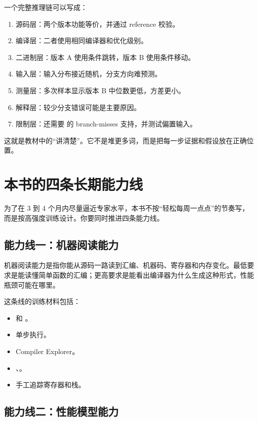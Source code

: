 一个完整推理链可以写成：

\begin{enumerate}
  \item 源码层：两个版本功能等价，并通过 reference 校验。
  \item 编译层：二者使用相同编译器和优化级别。
  \item 二进制层：版本 A 使用条件跳转，版本 B 使用条件移动。
  \item 输入层：输入分布接近随机，分支方向难预测。
  \item 测量层：多次样本显示版本 B 中位数更低，方差更小。
  \item 解释层：较少分支错误可能是主要原因。
  \item 限制层：还需要  的 branch-misses 支持，并测试偏置输入。
\end{enumerate}

这就是教材中的“讲清楚”。它不是堆更多词，而是把每一步证据和假设放在正确位置。

\section{本书的四条长期能力线}

为了在 3 到 4 个月内尽量逼近专家水平，本书不按“轻松每周一点点”的节奏写，而是按高强度训练设计。你要同时推进四条能力线。

\subsection{能力线一：机器阅读能力}

机器阅读能力是指你能从源码一路读到汇编、机器码、寄存器和内存变化。最低要求是能读懂简单函数的汇编；更高要求是能看出编译器为什么生成这种形式，性能瓶颈可能在哪里。

这条线的训练材料包括：

\begin{itemize}
  \item {} 和 。
  \item {} 单步执行。
  \item Compiler Explorer。
  \item {}、。
  \item 手工追踪寄存器和栈。
\end{itemize}

\subsection{能力线二：性能模型能力}

